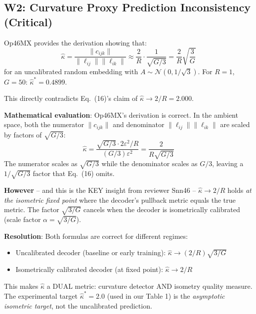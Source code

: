\documentclass{article}
\begin{document}
\subsection{W2: Curvature Proxy Prediction Inconsistency (Critical)}

\begin{correct}
Op46MX provides the derivation showing that:
\[
  \hat{\kappa} = \frac{\|c_{ijk}\|}{\|\ell_{ij}\|\|\ell_{ik}\|}
  \approx \frac{2}{R} \cdot \frac{1}{\sqrt{G/3}} = \frac{2}{R}\sqrt{\frac{3}{G}}
\]
for an uncalibrated random embedding with $A \sim \mathcal{N}(0, 1/\sqrt{3})$.
For $R=1$, $G=50$: $\hat{\kappa}^* = 0.4899$.

This directly contradicts Eq.~(16)'s claim of $\hat{\kappa} \to 2/R = 2.000$.

\textbf{Mathematical evaluation}: Op46MX's derivation is correct. In the
ambient space, both the numerator $\|c_{ijk}\|$ and denominator
$\|\ell_{ij}\|\|\ell_{ik}\|$ are scaled by factors of $\sqrt{G/3}$:
\[
  \hat{\kappa} = \frac{\sqrt{G/3} \cdot 2\varepsilon^2/R}{(G/3)\varepsilon^2} = \frac{2}{R\sqrt{G/3}}
\]
The numerator scales as $\sqrt{G/3}$ while the denominator scales as $G/3$,
leaving a $1/\sqrt{G/3}$ factor that Eq.~(16) omits.

\textbf{However} -- and this is the KEY insight from reviewer Snn46 --
$\hat{\kappa} \to 2/R$ holds \emph{at the isometric fixed point} where the
decoder's pullback metric equals the true metric. The factor $\sqrt{3/G}$ cancels
when the decoder is isometrically calibrated (scale factor $\alpha = \sqrt{3/G}$).

\textbf{Resolution}: Both formulas are correct for different regimes:
\begin{itemize}
  \item Uncalibrated decoder (baseline or early training): $\hat{\kappa} \to (2/R)\sqrt{3/G}$
  \item Isometrically calibrated decoder (at fixed point): $\hat{\kappa} \to 2/R$
\end{itemize}
This makes $\hat{\kappa}$ a DUAL metric: curvature detector AND isometry quality
measure. The experimental target $\hat{\kappa}^* = 2.0$ (used in our Table 1)
is the \emph{asymptotic isometric target}, not the uncalibrated prediction.


\end{correct}
\end{document}
